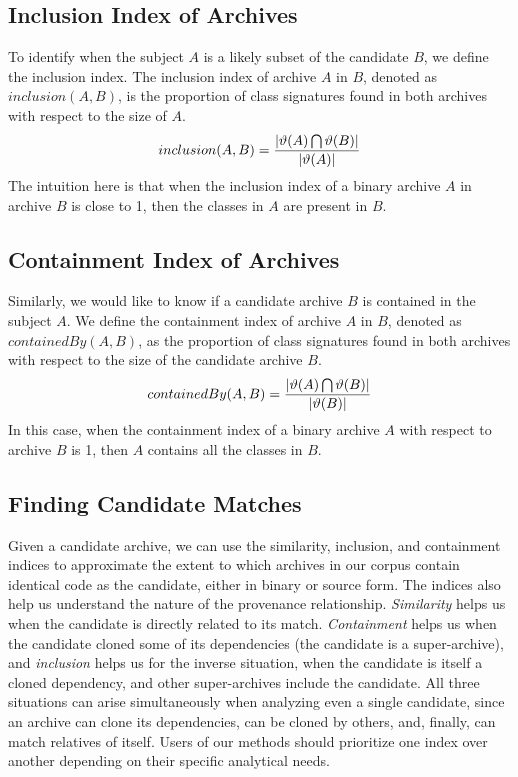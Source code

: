 \subsection{Inclusion Index of Archives}

To identify when the subject $A$ is a likely subset of the candidate $B$, we
define the inclusion index.
The inclusion index of archive $A$ in $B$,
denoted as $inclusion(A,B)$, is the proportion of class signatures found
in both archives with respect to the size of $A$.  
\[ inclusion(A,B) = {{| \vartheta(A) \bigcap \vartheta(B) |
  }\over{| \ensuremath{\vartheta(A)}}| }\]
The intuition here is that when the inclusion index of a binary archive $A$
in archive $B$ is close to 1, then the classes in $A$ are present in $B$.


\subsection{Containment Index of Archives}

Similarly, we would like to know if a candidate archive $B$ is contained in the
subject $A$.  We define the containment index of archive $A$ in $B$,
denoted as $containedBy(A,B)$, as the proportion of class signatures
found in both archives with respect to the size of the candidate archive
$B$.  
\[ containedBy(A,B) = {{| \vartheta(A) \bigcap \vartheta(B) |
  }\over{| \ensuremath{\vartheta(B)}}| }\]
In this case, when the containment index of a binary archive $A$ with respect to
archive $B$ is 1, then $A$ contains all the classes in $B$.

\subsection{Finding Candidate Matches} %
\label{sec:finding}

Given a candidate archive, we can use the similarity,
inclusion, and containment indices to approximate the
extent to which archives in our corpus contain identical
code as the candidate, either in binary or source form.
The indices also help us understand the nature of the
provenance relationship.  \emph{Similarity} helps us when
the candidate is directly related to its match.
\emph{Containment} helps us when the candidate cloned some
of its dependencies (the candidate is a super-archive),
and \emph{inclusion} helps us for the inverse situation,
when the candidate is itself a cloned dependency,
and other super-archives include the candidate.
All three situations can arise simultaneously when
analyzing even a single candidate, since an archive can
clone its dependencies, can be cloned by others, and,
finally, can match relatives of itself.  Users of our
methods should prioritize one index over another depending
on their specific analytical needs.

